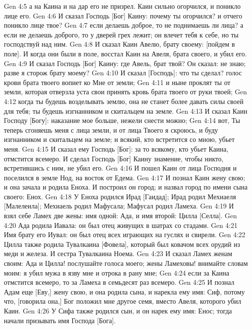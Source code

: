 \vs Gen 4:5 а на Каина и на дар его не призрел. Каин сильно огорчился, и поникло лице его.
\vs Gen 4:6 И сказал Господь [Бог] Каину: почему ты огорчился? и отчего поникло лице твое?
\vs Gen 4:7 если делаешь доброе, то не поднимаешь ли лица? а если не делаешь доброго, то у дверей грех лежит; он влечет тебя к себе, но ты господствуй над ним.
\vs Gen 4:8 И сказал Каин Авелю, брату своему: [пойдем в поле]. И когда они были в поле, восстал Каин на Авеля, брата своего, и убил его.
\rsbpar\vs Gen 4:9 И сказал Господь [Бог] Каину: где Авель, брат твой? Он сказал: не знаю; разве я сторож брату моему?
\vs Gen 4:10 И сказал [Господь]: что ты сделал? голос крови брата твоего вопиет ко Мне от земли;
\vs Gen 4:11 и ныне проклят ты от земли, которая отверзла уста свои принять кровь брата твоего от руки твоей;
\vs Gen 4:12 когда ты будешь возделывать землю, она не станет более давать силы своей для тебя; ты будешь изгнанником и скитальцем на земле.
\vs Gen 4:13 И сказал Каин Господу [Богу]: наказание мое больше, нежели снести можно;
\vs Gen 4:14 вот, Ты теперь сгоняешь меня с лица земли, и от лица Твоего я скроюсь, и буду изгнанником и скитальцем на земле; и всякий, кто встретится со мною, убьет меня.
\vs Gen 4:15 И сказал ему Господь [Бог]: за то всякому, кто убьет Каина, отмстится всемеро. И сделал Господь [Бог] Каину знамение, чтобы никто, встретившись с ним, не убил его.
\vs Gen 4:16 И пошел Каин от лица Господня и поселился в земле Нод, на восток от Едема.
\vs Gen 4:17 И познал Каин жену свою; и она зачала и родила Еноха. И построил он город; и назвал город по имени сына своего: Енох.
\vs Gen 4:18 У Еноха родился Ирад [Гаидад]; Ирад родил Мехиаеля [Малелеила]; Мехиаель родил Мафусала; Мафусал родил Ламеха.
\vs Gen 4:19 И взял себе Ламех две жены: имя одной: Ада, и имя второй: Цилла [Селла].
\vs Gen 4:20 Ада родила Иавала: он был отец живущих в шатрах со стадами.
\vs Gen 4:21 Имя брату его Иувал: он был отец всех играющих на гуслях и свирели.
\vs Gen 4:22 Цилла также родила Тувалкаина [Фовела], который был ковачом всех орудий из меди и железа. И сестра Тувалкаина Ноема.
\vs Gen 4:23 И сказал Ламех женам своим: Ада и Цилла! послушайте голоса моего; жены Ламеховы! внимайте словам моим: я убил мужа в язву мне и отрока в рану мне;
\vs Gen 4:24 если за Каина отмстится всемеро, то за Ламеха в семьдесят раз всемеро.
\rsbpar\vs Gen 4:25 И познал Адам еще [Еву,] жену свою, и она родила сына, и нарекла ему имя: Сиф, потому что, [говорила она,] Бог положил мне другое семя, вместо Авеля, которого убил Каин.
\vs Gen 4:26 У Сифа также родился сын, и он нарек ему имя: Енос; тогда начали призывать имя Господа [Бога].
